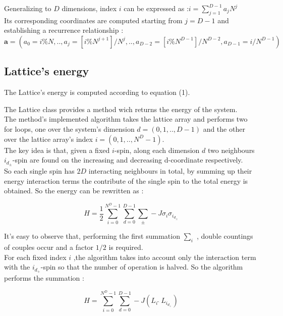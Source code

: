\documentclass[11pt,a4paper]{article}
\begin{document}
Generalizing to $D$ dimensions, index $i$ can be expressed as :$ i = \sum_{j=1}^{D-1}a_jN^j $ \\
Its corresponding coordinates are computed starting from $j=D-1$ and establishing a recurrence relationship :
$$\mathbf{a} = \left(a_0 = i\%N ,.., a_j = [i\%N^{j+1}]/N^j ,.., a_{D-2} = [i\% N^{D-1}]/N^{D-2} , a_{D-1} = i/N^{D-1}\right)$$


\newpage
\subsection*{Lattice's energy }

The Lattice's energy is computed according to equation (1).



The Lattice class provides a method wich returns the energy of the system. \\
The method's implemented algorithm takes the lattice array and performs two for loops, one over the system's dimension $d = (0,1,..,D-1)$ and the other over the lattice array's index $i = (0,1,..,N^D-1)$. \\
The key idea is that, given a fixed $i$-spin, along each dimension $d$ two neighbours $i_{d_\pm}$-spin are found on the increasing and decreasing d-coordinate respectively.
\\So each single spin has $2D$ interacting neighbours in total, by summing up their energy interaction terms the contribute of the single spin to the total energy is obtained. So the energy can be rewritten as :

$$H = \frac{1}{2}\sum_{i=0}^{N^D-1}\sum_{d=0}^{D-1}\sum_{\pm}^{} -J\sigma_i\sigma_{i_{d_\pm}}$$

It's easy to observe that, performing the first summation $\sum_{i}^{}$ , double countings of couples occur and a factor $1/2$ is required. \\
For each fixed index $i$ ,the algorithm takes into account only the interaction term with the
$i_{d_+}$-spin so that the number of operation is halved. So the algorithm performs the summation :

$$H = \sum_{i=0}^{N^D-1}\sum_{d=0}^{D-1}-J(L_i \ \hat{} \ L_{i_{d_+}})$$
\end{document}
